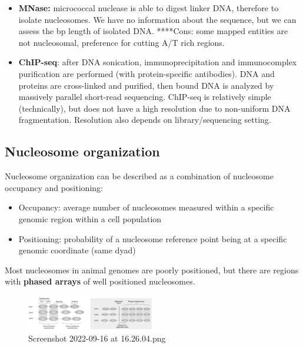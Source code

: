 \begin{itemize}
\tightlist
\item
  \textbf{MNase:} micrococcal nuclease is able to digest linker DNA, therefore to isolate nucleosomes. We have no information about the sequence, but we can assess the bp length of isolated DNA. ****Cons: some mapped entities are not nucleosomal, preference for cutting A/T rich regions.
\item
  \textbf{ChIP-seq}: after DNA sonication, immunoprecipitation and immunocomplex purification are performed (with protein-specific antibodies). DNA and proteins are cross-linked and purified, then bound DNA is analyzed by massively parallel short-read sequencing. ChIP-seq is relatively simple (technically), but does not have a high resolution due to non-uniform DNA fragmentation. Resolution also depends on library/sequencing setting.
\end{itemize}

\hypertarget{nucleosome-organization}{%
\subsection{Nucleosome organization}\label{nucleosome-organization}}

Nucleosome organization can be described as a combination of nucleosome occupancy and positioning:

\begin{itemize}
\tightlist
\item
  Occupancy: average number of nucleosomes measured within a specific genomic region within a cell population
\item
  Positioning: probability of a nucleosome reference point being at a specific genomic coordinate (same dyad)
\end{itemize}

Most nucleosomes in animal genomes are poorly positioned, but there are regions with \textbf{phased arrays} of well positioned nucleosomes.

\begin{figure}
\centering
\includegraphics[width=0.5\textwidth]{../_resources/Screenshot_2022-09-16_at_16-26-04.png}
\caption{Screenshot 2022-09-16 at 16.26.04.png}
\end{figure}

